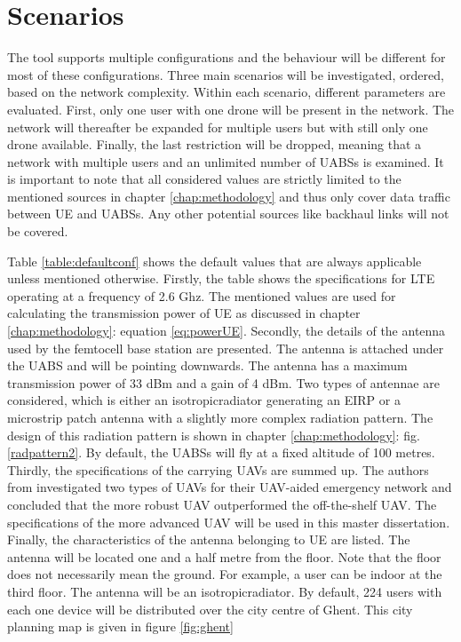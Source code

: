 \chapter{Scenarios}
\label{chap:scenarios} 
The tool supports multiple configurations and the behaviour will be different for most of these configurations. Three main scenarios 
will be investigated, ordered, based on the network complexity. Within each scenario, different parameters are evaluated.
First, only one user with one drone will be present in the network. The network will thereafter be expanded
for multiple users but with still only one drone available. Finally, the last restriction will be dropped, meaning 
that a network with multiple users and an unlimited number of \gls{UABS}s is examined.
It is important to note that 
all considered values are strictly limited to the mentioned sources in chapter \ref{chap:methodology} and thus only cover data traffic 
between \gls{UE} and \gls{UABS}s. Any other potential sources like backhaul links will not be covered.

Table \ref{table:defaultconf} shows the default values that are always applicable unless mentioned otherwise. 
Firstly, the table shows 
the specifications for LTE operating at a frequency of 2.6 Ghz. The mentioned values are used for calculating 
the transmission power of \gls{UE} as discussed in chapter \ref{chap:methodology}: equation \ref{eq:powerUE}. 
Secondly, the details of the antenna
used by the femtocell base station are presented. The antenna is attached under the \gls{UABS} and will be pointing downwards. 
The antenna has a maximum transmission power of 33 dBm and 
a gain of 4 dBm. Two types of antennae are considered, which is either an \gls{isotropicradiator}  generating an \gls{EIRP} 
or a microstrip patch antenna with a slightly more complex radiation pattern. The design of this radiation pattern is shown 
in chapter \ref{chap:methodology}: fig. \ref{radpattern2}. By default, the \gls{UABS}s will fly at a fixed altitude of 100 metres.
Thirdly, the specifications of the carrying \gls{UAV}s are summed up. 
The authors from \cite{J2} investigated two types of \gls{UAV}s for their \gls{UAV}-aided emergency network 
and concluded that the more robust \gls{UAV} outperformed the off-the-shelf \gls{UAV}.
The specifications of the more advanced \gls{UAV} will be used in this master dissertation.
Finally, the characteristics of the antenna belonging to \gls{UE} are listed. The antenna will be located 
one and a half metre from the floor. Note that the floor does not necessarily mean the ground.
For example, a user can be indoor at the third floor.
The antenna will be an \gls{isotropicradiator}. By default, 224 users with each one device 
will be distributed over the city centre of Ghent. This city planning map is given in figure \ref{fig:ghent}

